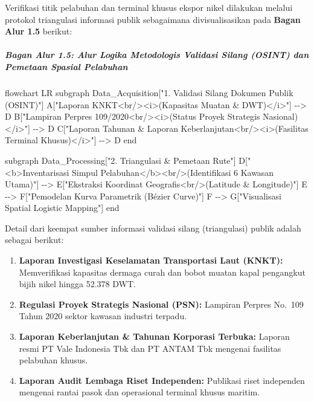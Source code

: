 \documentclass[
]{article}
\newenvironment{Shaded}{}{}
\newcommand{\NormalTok}[1]{#1}
\providecommand{\tightlist}{%
  \setlength{\itemsep}{0pt}\setlength{\parskip}{0pt}}
\begin{document}
Verifikasi titik pelabuhan dan terminal khusus ekspor nikel dilakukan
melalui protokol triangulasi informasi publik sebagaimana
divisualisasikan pada \textbf{Bagan Alur 1.5} berikut:

\subparagraph{Bagan Alur 1.5: Alur Logika Metodologis Validasi Silang
(OSINT) dan Pemetaan Spasial
Pelabuhan}\label{bagan-alur-1.5-alur-logika-metodologis-validasi-silang-osint-dan-pemetaan-spasial-pelabuhan}

\begin{Shaded}
\begin{Highlighting}[]
\NormalTok{flowchart LR}
\NormalTok{    subgraph Data\_Acquisition["1. Validasi Silang Dokumen Publik (OSINT)"]}
\NormalTok{        A["Laporan KNKT\textless{}br/\textgreater{}\textless{}i\textgreater{}(Kapasitas Muatan \& DWT)\textless{}/i\textgreater{}"] {-}{-}\textgreater{} D}
\NormalTok{        B["Lampiran Perpres 109/2020\textless{}br/\textgreater{}\textless{}i\textgreater{}(Status Proyek Strategis Nasional)\textless{}/i\textgreater{}"] {-}{-}\textgreater{} D}
\NormalTok{        C["Laporan Tahunan \& Laporan Keberlanjutan\textless{}br/\textgreater{}\textless{}i\textgreater{}(Fasilitas Terminal Khusus)\textless{}/i\textgreater{}"] {-}{-}\textgreater{} D}
\NormalTok{    end}

\NormalTok{    subgraph Data\_Processing["2. Triangulasi \& Pemetaan Rute"]}
\NormalTok{        D["\textless{}b\textgreater{}Inventarisasi Simpul Pelabuhan\textless{}/b\textgreater{}\textless{}br/\textgreater{}(Identifikasi 6 Kawasan Utama)"] {-}{-}\textgreater{} E["Ekstraksi Koordinat Geografis\textless{}br/\textgreater{}(Latitude \& Longitude)"]}
\NormalTok{        E {-}{-}\textgreater{} F["Pemodelan Kurva Parametrik (Bézier Curve)"]}
\NormalTok{        F {-}{-}\textgreater{} G["Visualisasi Spatial Logistic Mapping"]}
\NormalTok{    end}
\end{Highlighting}
\end{Shaded}

Detail dari keempat sumber informasi validasi silang (triangulasi)
publik adalah sebagai berikut:

\begin{enumerate}
\def\labelenumi{\arabic{enumi}.}
\tightlist
\item
  \textbf{Laporan Investigasi Keselamatan Transportasi Laut (KNKT):}
  Memverifikasi kapasitas dermaga curah dan bobot muatan kapal
  pengangkut bijih nikel hingga 52.378 DWT.
\item
  \textbf{Regulasi Proyek Strategis Nasional (PSN):} Lampiran Perpres
  No.~109 Tahun 2020 sektor kawasan industri terpadu.
\item
  \textbf{Laporan Keberlanjutan \& Tahunan Korporasi Terbuka:} Laporan
  resmi PT Vale Indonesia Tbk dan PT ANTAM Tbk mengenai fasilitas
  pelabuhan khusus.
\item
  \textbf{Laporan Audit Lembaga Riset Independen:} Publikasi riset
  independen mengenai rantai pasok dan operasional terminal khusus
  maritim.
\end{enumerate}
\end{document}
